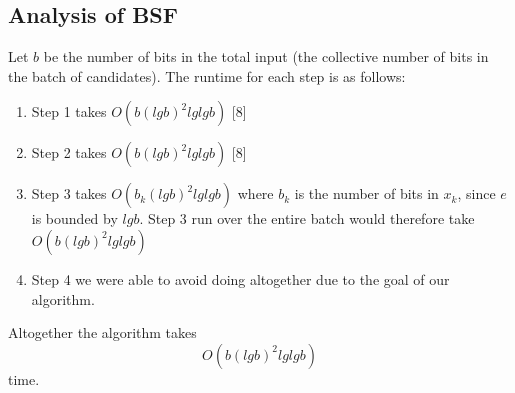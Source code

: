 \documentclass{article}
\begin{document}
  \subsection{Analysis of BSF}
  Let $b$ be the number of bits in the total input (the collective number of bits in the batch of candidates).  The runtime for each step is as follows: \\
    \begin{enumerate}
      \item Step 1 takes $O(b(lgb)^2lglgb)$ [8] 
      \item Step 2 takes $O(b(lgb)^2lglgb)$ [8]
      \item Step 3 takes $O(b_k(lgb)^2lglgb)$ where $b_k$ is the number of bits in $x_k$, since $e$ is bounded by $lgb$.  Step 3 run over the entire batch would therefore take $O(b(lgb)^2lglgb)$
      \item Step 4 we were able to avoid doing altogether due to the goal of our algorithm.
    \end{enumerate}
  Altogether the algorithm takes $$O(b(lgb)^2lglgb)$$ time.
\end{document}
